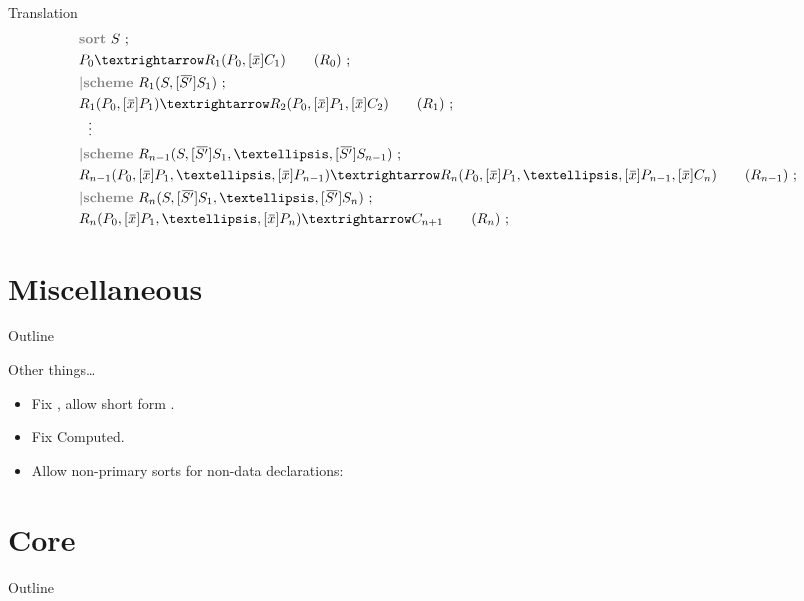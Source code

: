 \documentclass[pdftex,aspectratio=169,14pt]{beamer}
\begin{document}
\begin{frame}{Translation}
  \vspace*{-1em}
  \begin{align*}
    &\kw{sort}~S~;\\
    & P_0 → R_1(P_0, [\ov{x}]C_1) \tag{$R_0$} ~;
    \\
    &\kw{|scheme} ~ R_1(S, [\ov{S'}]S_1) ~;\\
    &R_1(P_0, [\ov{x}]P_1) → R_2(P_0, [\ov{x}]P_1, [\ov{x}]C_2) \tag{$R_1$} ~;
    \\[-\jot]
    &~~\vdots\notag\\
    &\kw{|scheme} ~ R_{n-1}(S, [\ov{S'}]S_1,…, [\ov{S'}]S_{n-1}) ~;\\
    &R_{n-1}(P_0, [\ov{x}]P_1, …, [\ov{x}]P_{n-1}) → R_n(P_0, [\ov{x}]P_1, …, [\ov{x}]P_{n-1}, [\ov{x}]C_n) \tag{$R_{n-1}$} ~;
    \\
    &\kw{|scheme} ~ R_n(S, [\ov{S'}]S_1,…, [\ov{S'}]S_n) ~;\\
    &R_n(P_0, [\ov{x}]P_1, …, [\ov{x}]P_n) → C_{n+1} \tag{$R_n$} ~;
  \end{align*}
\end{frame}


\section{Miscellaneous}
\begin{frame}{Outline}
  \tableofcontents[current]
\end{frame}

\begin{frame}[fragile]{Other things…}
  \begin{itemize}
  \item Fix , allow short form .
  \item Fix Computed.
  \item Allow non-primary sorts for non-data declarations:
  \end{itemize}
\end{frame}


\section{Core \HAX}
\begin{frame}{Outline}
  \tableofcontents[current]
\end{frame}
\end{document}
